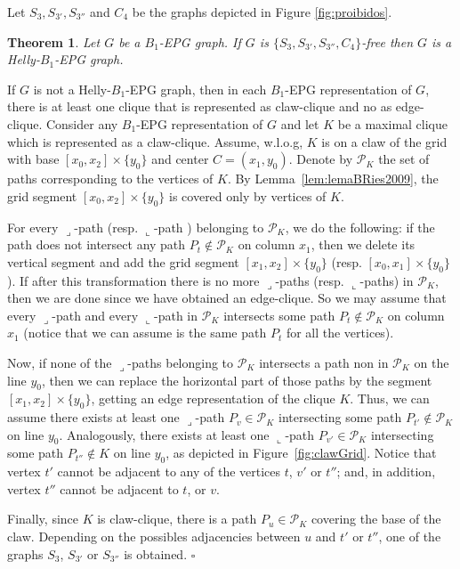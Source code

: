 \documentclass[9pt]{entcs}
\newtheorem{teo}[thm]{Theorem}%
\begin{document}
Let $S_{3}, S_{3'}, S_{3''}$ and $ C_{4}$ be the graphs depicted in Figure \ref{fig:proibidos}. 


\begin{teo}
\label{lem:chordalDiamondFree}
Let $G$ be a $B_1$-EPG graph. If $G$ is  $\{S_{3}, S_{3'}, S_{3''}, C_{4}\}$-free then $G$  is a Helly-$B_1$-EPG graph.
\end{teo}

\begin{pf}
If $G$ is not a Helly-$B_1$-EPG graph, then in each $B_1$-EPG representation of $G$, there is at least one clique that is represented as claw-clique and no as edge-clique. Consider any $B_1$-EPG  representation of $G$  and let $K$ be a maximal clique  which is represented as a claw-clique. Assume, w.l.o.g,  $K$ is on a claw of the grid with base $[x_0, x_2]\times\{y_0\}$ and center $C = (x_1, y_0)$. Denote by  $\mathcal{P}_K$ the set of paths corresponding to the vertices of $K$.  By Lemma~\ref{lem:lemaBRies2009},  %
the grid segment $[x_0, x_2]\times\{y_0\}$ is covered only by vertices of $K$. %


 For every ${\displaystyle \lrcorner}$-path %
 (resp. ${\displaystyle \llcorner}$-path 
 ) belonging to $\mathcal{P}_K$, we do the following: if %
 the path does not intersect any path $P_t \notin\mathcal{P}_K$ on column $x_1$, then we delete its vertical segment and add the grid segment $[x_1, x_2]\times\{y_0\}$ (resp. $[x_0, x_1]\times\{y_0\}$). If after this transformation there is no more ${\displaystyle \lrcorner}$-paths (resp. ${\displaystyle \llcorner}$-paths) in $\mathcal{P}_K$, then we are done since we have obtained an edge-clique. So we may assume that
 every ${\displaystyle \lrcorner}$-path   and every ${\displaystyle \llcorner}$-path  in $ \mathcal{P}_K$ intersects some path $P_t \notin \mathcal{P}_K$   on column $x_1$ (notice that we can assume is the same path $P_t$ for all the vertices). 
 
 Now, if none of the ${\displaystyle \lrcorner}$-paths belonging to $\mathcal{P}_K$ intersects  a path non in  $ \mathcal{P}_K$ on the line $y_0$, then we can replace the horizontal part of those paths by the segment $[x_1,x_2]\times \{y_0\}$, getting an edge representation of the clique $K$. Thus, we can assume there exists
 at least one ${\displaystyle \lrcorner}$-path $P_{v} \in \mathcal{P}_K$ intersecting some path  $P_{t'} \notin \mathcal{P}_K$ on line $y_0$. Analogously, there exists
 at least one ${\displaystyle \llcorner}$-path $P_{v'} \in \mathcal{P}_K$ intersecting some path  $P_{t''} \notin K$ on line $y_0$, as depicted in Figure~\ref{fig:clawGrid}. Notice that vertex $t'$ cannot be adjacent to any of the vertices $t$, $v'$ or $t''$; and, in addition, vertex $t''$ cannot
 be adjacent to   $t$,  or $v$.
 
 Finally,   since $K$ is claw-clique,  there is a path $P_u \in \mathcal{P}_K$ covering the base of the claw. Depending on the 
 possibles adjacencies between  $u$ and $t'$ or  $t''$, one of the graphs  $S_{3}$, $S_{3'}$ or $S_{3''}$ is obtained.
\hfill  $\square$
\end{pf}
\end{document}
